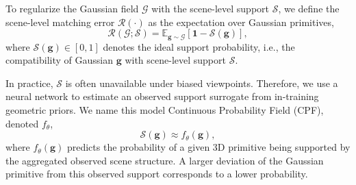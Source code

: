 \documentclass[lettersize,journal]{IEEEtran}
\begin{document}
To regularize the Gaussian field $\mathcal{G}$ with the scene-level support $\mathcal{S}$, we define the scene-level matching error $\mathcal{R}(\cdot)$ as the expectation over Gaussian primitives, 
\begin{equation}
    \mathcal{R}(\mathcal{G};\mathcal{S}) = \mathbb{E}_{\mathbf{g} \sim \mathcal{G}} \left[ \mathbf{1} - \mathcal{S} (\mathbf{g}) \right],
    \label{eq9}
\end{equation}
where $\mathcal{S} (\mathbf{g}) \in [0, 1]$ denotes the ideal support probability, i.e., the compatibility of Gaussian $\mathbf{g}$ with scene-level support $\mathcal{S}$.

In practice, $\mathcal{S}$ is often unavailable under biased viewpoints. Therefore, we use a neural network to estimate an observed support surrogate from in-training geometric priors. We name this model Continuous Probability Field (CPF), denoted $f_{\theta}$, 
\begin{equation}
    \mathcal{S}(\mathbf{g}) \approx f_{\theta}(\mathbf{g}), 
    \label{eq10}
\end{equation}
where $f_{\theta}(\mathbf{g})$ predicts the probability of a given 3D primitive being supported by the aggregated observed scene structure. 
A larger deviation of the Gaussian primitive from this observed support corresponds to a lower probability.
\end{document}
